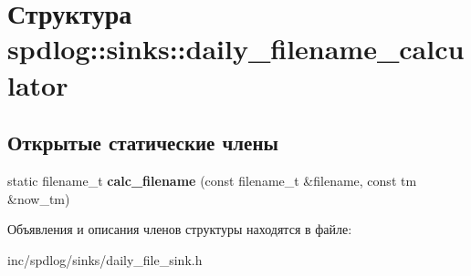 \hypertarget{structspdlog_1_1sinks_1_1daily__filename__calculator}{}\section{Структура spdlog\+:\+:sinks\+:\+:daily\+\_\+filename\+\_\+calculator}
\label{structspdlog_1_1sinks_1_1daily__filename__calculator}
\subsection*{Открытые статические члены}
\begin{DoxyCompactItemize}
\item 
\mbox{\label{structspdlog_1_1sinks_1_1daily__filename__calculator_ae8461e586d3426987a3b11a00b158db2}} 
static filename\+\_\+t {\bfseries calc\+\_\+filename} (const filename\+\_\+t \&filename, const tm \&now\+\_\+tm)
\end{DoxyCompactItemize}


Объявления и описания членов структуры находятся в файле\+:\begin{DoxyCompactItemize}
\item 
inc/spdlog/sinks/daily\+\_\+file\+\_\+sink.\+h\end{DoxyCompactItemize}
